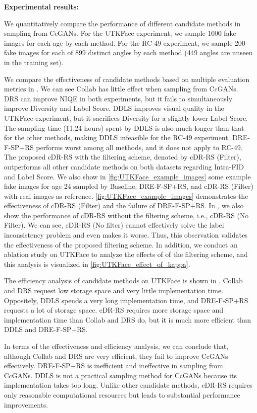 \documentclass[final,12pt, 3p,times]{elsarticle}
\begin{document}
{\setlength{\parindent}{0cm}\textbf{Experimental results:}} {\color{black}
We quantitatively compare the performance of different candidate methods in sampling from CcGANs. For the UTKFace experiment, we sample 1000 fake images for each age by each method. For the RC-49 experiment, we sample 200 fake images for each of 899 distinct angles by each method (449 angles are unseen in the training set). 

We compare the effectiveness of candidate methods based on multiple evaluation metrics in . We can see Collab has little effect when sampling from CcGANs. DRS can improve NIQE in both experiments, but it fails to simultaneously improve Diversity and Label Score. DDLS improves visual quality in the UTKFace experiment, but it sacrifices Diversity for a slightly lower Label Score. The sampling time (11.24 hours) spent by DDLS is also much longer than that for the other methods, making DDLS infeasible for the RC-49 experiment. DRE-F-SP+RS performs worst among all methods, and it does not apply to RC-49. The proposed cDR-RS with the filtering scheme, denoted by cDR-RS (Filter), outperforms all other candidate methods on both datasets regarding Intra-FID and Label Score. We also show in \cref{fig:UTKFace_example_images} some example fake images for age 24 sampled by Baseline, DRE-F-SP+RS, and cDR-RS (Filter) with real images as reference. \cref{fig:UTKFace_example_images} demonstrates the effectiveness of cDR-RS (Filter) and the failure of DRE-F-SP+RS. In , we also show the performance of cDR-RS without the filtering scheme, i.e., cDR-RS (No Filter). We can see, cDR-RS (No filter) cannot effectively solve the label inconsistency problem and even makes it worse. Thus, this observation validates the effectiveness of the proposed filtering scheme. In addition, we conduct an ablation study on UTKFace to analyze the effects of  of the filtering scheme, and this analysis is visualized in \cref{fig:UTKFace_effect_of_kappa}. 

The efficiency analysis of candidate methods on UTKFace is shown in . Collab and DRS request low storage space and very little implementation time. Oppositely, DDLS spends a very long implementation time, and DRE-F-SP+RS requests a lot of storage space. cDR-RS requires more storage space and implementation time than Collab and DRS do, but it is much more efficient than DDLS and DRE-F-SP+RS.

In terms of the effectiveness and efficiency analysis, we can conclude that, although Collab and DRS are very efficient, they fail to improve CcGANs effectively. DRE-F-SP+RS is inefficient and ineffective in sampling from CcGANs. DDLS is not a practical sampling method for CcGANs because its implementation takes too long. Unlike other candidate methods, cDR-RS requires only reasonable computational resources but leads to substantial performance improvements.






}
\end{document}
